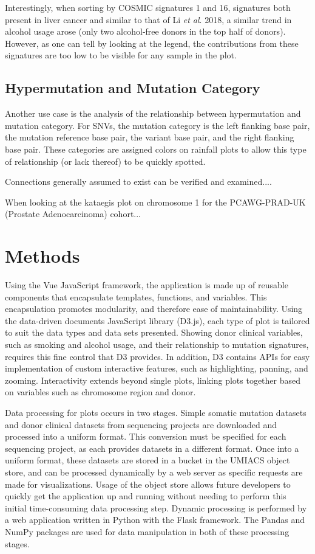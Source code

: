 \documentclass[12pt, letterpaper]{article}
\begin{document}
Interestingly, when sorting by COSMIC signatures 1 and 16, signatures both present in liver cancer and similar to that of Li \textit{et al}. 2018, a similar trend in alcohol usage arose (only two alcohol-free donors in the top half of donors).
However, as one can tell by looking at the legend, the contributions from these signatures are too low to be visible for any sample in the plot.


\subsection{Hypermutation and Mutation Category}
Another use case is the analysis of the relationship between hypermutation and mutation category.
For SNVs, the mutation category is the left flanking base pair, the mutation reference base pair, the variant base pair, and the right flanking base pair.
These categories are assigned colors on rainfall plots to allow this type of relationship (or lack thereof) to be quickly spotted.

Connections generally assumed to exist can be verified and examined....

When looking at the kataegis plot on chromosome 1 for the PCAWG-PRAD-UK (Prostate Adenocarcinoma) cohort...



\section{Methods}
Using the Vue JavaScript framework, the application is made up of reusable components that encapsulate templates, functions, and variables.
This encapsulation promotes modularity, and therefore ease of maintainability.
Using the data-driven documents JavaScript library (D3.js)\cite{bostock2011d3}, each type of plot is tailored to suit the data types and data sets presented.
Showing donor clinical variables, such as smoking and alcohol usage, and their relationship to mutation signatures, requires this fine control that D3 provides.
In addition, D3 contains APIs for easy implementation of custom interactive features, such as highlighting, panning, and zooming.
Interactivity extends beyond single plots, linking plots together based on variables such as chromosome region and donor.

Data processing for plots occurs in two stages. 
Simple somatic mutation datasets and donor clinical datasets from sequencing projects are downloaded and processed into a uniform format. 
This conversion must be specified for each sequencing project, as each provides datasets in a different format.
Once into a uniform format, these datasets are stored in a bucket in the UMIACS object store, and can be processed dynamically by a web server as specific requests are made for visualizations.
Usage of the object store allows future developers to quickly get the application up and running without needing to perform this initial time-consuming data processing step.
Dynamic processing is performed by a web application written in Python with the Flask framework. 
The Pandas and NumPy packages are used for data manipulation in both of these processing stages.
\end{document}
